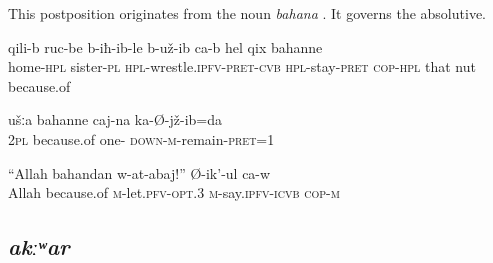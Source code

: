 This postposition originates from the noun \textit{bahana} . It governs the absolutive.
%
\begin{exe}
	\ex
	\begin{xlist}
		\ex	\label{At home the sisters were apparently arguing because of the nut}
		\gll	qili-b	ruc-be	b-iħ-ib-le	b-už-ib ca-b	hel	qix	bahanne  \\
			home-\textsc{hpl}	sister-\textsc{pl}	\textsc{hpl}-wrestle.\textsc{ipfv}-\textsc{pret}-\textsc{cvb}	\textsc{hpl}-stay-\textsc{pret} \textsc{cop-hpl}	that	nut	because.of\\
		\glt	{}

		\ex	\label{Because of you I sat in prison once}
		\gll	ušːa	bahanne	caj-na	ka-Ø-jž-ib=da  \\
			2\textsc{pl}	because.of	one-	\textsc{down-m}-remain-\textsc{pret}=1\\
		\glt	{}

		\ex	\label{For God’s sake, let me, he says}
		\gll	``Allah	bahandan	w-at-abaj!''	Ø-ik'-ul	ca-w  \\
			Allah	because.of	\textsc{m}-let.\textsc{pfv}-\textsc{opt}.3	\textsc{m}-say.\textsc{ipfv}-\textsc{icvb}	\textsc{cop-m}\\
		\glt	{}
	\end{xlist}
\end{exe}



\subsection{\textit{akːʷar} }
\label{ssec:postposition akwar}

